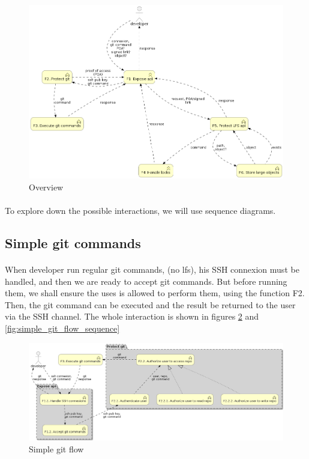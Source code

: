 \begin{figure}[H]
    \centering
    \includegraphics[width=\textwidth]{design/diagrams/overwiew_flow.png}
    \caption{Overview}
    \label{fig:functions_overview}
\end{figure}

\paragraph{}
To explore down the possible interactions, we will use sequence diagrams. 

\subsection{Simple git commands}

\paragraph{}
When developer run regular git commands, (no lfs), his SSH connexion must be handled, and then we are ready to accept git commands. But before running them, we shall ensure the uses is allowed to perform them, using the function F2. Then, the git command can be executed and the result be returned to the user via the SSH channel. The whole interaction is shown in figures \ref{fig:simple_git_flow} and \ref{fig:simple_git_flow_sequence}

\begin{figure}[H]
    \centering
    \includegraphics[width=\textwidth]{design/diagrams/simple_git_flow.png}
    \caption{Simple git flow}
    \label{fig:simple_git_flow}
\end{figure}


